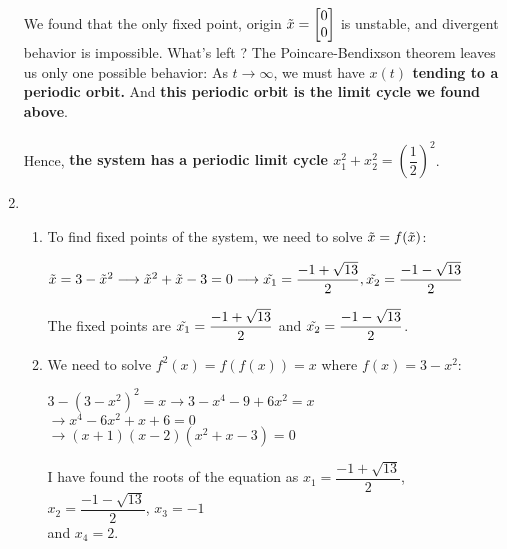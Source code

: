 \documentclass[12pt,a4paper, margin=1in]{article}
\begin{document}
\begin{enumerate}
            We found that the only fixed point, origin $\Tilde{x} = \begin{bmatrix}
                0 \\0
            \end{bmatrix}$ is unstable, and divergent behavior is impossible. What's left ? The Poincare-Bendixson theorem leaves us only one possible behavior: As $t \longrightarrow \infty$, we must have \textbf{$x(t)$ tending to a periodic orbit.} 
            And \textbf{this periodic orbit is the limit cycle we found above}. \\\\

            Hence, \textbf{the system has a periodic limit cycle  $x_1^2 + x_2^2  = (\dfrac{1}{2})^2$}.
    
        

\newpage

    \item %
        \begin{enumerate}
            \item To find fixed points of the system, we need to solve $\Tilde{x} = f(\Tilde{x})$:
                \begin{center}
                    $\Tilde{x} = 3 - \Tilde{x}^2 \longrightarrow \Tilde{x}^2 + \Tilde{x} - 3 = 0 \longrightarrow \Tilde{x_1} = \dfrac{-1 + \sqrt{13}}{2}, \Tilde{x_2} = \dfrac{-1 - \sqrt{13}}{2}$
                \end{center}
            The fixed points are $\Tilde{x_1} = \dfrac{-1 + \sqrt{13}}{2}$ and $\Tilde{x_2} = \dfrac{-1 - \sqrt{13}}{2}$.  \\
     
            
            \item We need to solve $f^2(x) = f(f(x)) = x$ where $f(x) = 3 - x^2$:

            \begin{center}
                $3 - (3 - x^2)^2 = x \longrightarrow 3 - x^4 - 9 + 6x^2 = x$ \\ $\longrightarrow x^4 - 6x^2 + x + 6 = 0$ \\
                $\longrightarrow (x+1)(x-2)(x^2 + x - 3) = 0$
            \end{center}

            I have found the roots of the equation as $x_1 = \dfrac{-1 + \sqrt{13}}{2}$, $x_2 = \dfrac{-1 - \sqrt{13}}{2}$, $x_3 = -1$ \\ and $x_4 = 2$. \\ 


\end{enumerate}
\end{enumerate}
\end{document}
